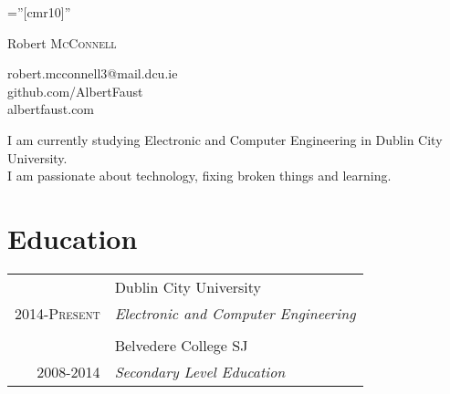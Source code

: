 \documentclass[a4paper,10pt]{article}
\begin{document}
\pagestyle{empty} 

\font\fb=''[cmr10]'' 

\par{\centering
		{\Huge Robert \textsc{McConnell}
	}\bigskip\par}

\par{\centering
    robert.mcconnell3@mail.dcu.ie \\
    github.com/AlbertFaust \\ 
    albertfaust.com \\
}\bigskip\par
\par{\centering
I am currently studying Electronic and Computer Engineering in Dublin City University. \\
I am passionate about technology, fixing broken things and learning. \\
}\bigskip\par
\section{\textbf{Education}}

\begin{tabular}{r|p{11cm}}
 \emph & Dublin City University \\\textsc{2014-Present}&\emph{Electronic and Computer Engineering}\\\multicolumn{2}{c}{} \\
\emph & Belvedere College SJ \\\textsc{2008-2014}&\emph{Secondary Level Education}\\
\end{tabular}
\end{document}

